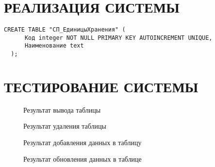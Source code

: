 \documentclass[
  12pt, %
  a4paper, %
  simple, %
  floatsection %
]{eskdtext}
\begin{document}
  \newpage
  \section{РЕАЛИЗАЦИЯ СИСТЕМЫ}

  \begin{lstlisting}[name=Справочник "Единицы хранения"]
  CREATE TABLE "СП_ЕдиницыХранения" (
      Код integer NOT NULL PRIMARY KEY AUTOINCREMENT UNIQUE,
      Наименование text
  );
  \end{lstlisting}

  \newpage
  \section{ТЕСТИРОВАНИЕ СИСТЕМЫ}

  \begin{figure}[!h]
    \centering
    \caption{Результат вывода таблицы}
  \end{figure}

  \begin{figure}[!h]
    \centering
    \caption{Результат удаления таблицы}
  \end{figure}

  \begin{figure}[!h]
    \centering
    \caption{Результат добавления данных в таблицу}
  \end{figure}

  \begin{figure}[!h]
    \centering
    \caption{Результат обновления данных в таблице}
  \end{figure}

  \newpage
\end{document}
